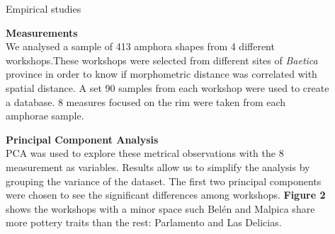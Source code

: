 \documentclass[final]{beamer}
\newlength{\sepwid}
\newlength{\onecolwid}
\newlength{\twocolwid}
\begin{document}
\begin{frame}[t]
\begin{columns}[t]
\begin{column}{\onecolwid}
\begin{block}{Empirical studies}

{\textbf{Measurements}} \\

We analysed a sample of 413 amphora shapes from 4 different workshops.These workshops were selected from different sites of \emph{Baetica} province in order to know if morphometric distance was correlated with spatial distance. A set 90 samples from each workshop were used to create a database. 8 measures focused on the rim were taken from each amphorae sample. 

\vspace{1cm}

{\textbf{Principal Component Analysis}} \\

PCA was used to explore these metrical observations with the 8 measurement as variables. Results allow us to simplify the analysis by grouping the variance of the dataset. The first two principal components were chosen to see the significant differences among workshops. \textbf{Figure 2} shows the workshops with a minor space such Bel\'en and Malpica share more pottery traits than the rest: Parlamento and Las Delicias.

 
\end{block}
\end{column} %



\begin{column}{\sepwid}\end{column} %

\begin{column}{\twocolwid} %


\begin{block}{}

\begin{columns}

\begin{column}{0.48\textwidth}


\end{column}

\begin{column}{0.48\textwidth}

\end{column}

\end{columns}


\end{block}
\end{column}
\end{columns}
\end{frame}
\end{document}
